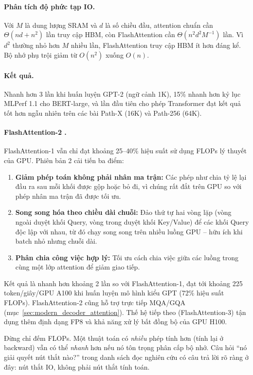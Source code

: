 \paragraph{Phân tích độ phức tạp IO.}
Với $M$ là dung lượng SRAM và $d$ là số chiều đầu, attention chuẩn cần $\Theta(nd + n^2)$ lần truy cập HBM, còn FlashAttention cần $\Theta(n^2 d^2 M^{-1})$ lần. Vì $d^2$ thường nhỏ hơn $M$ nhiều lần, FlashAttention truy cập HBM ít hơn đáng kể. Bộ nhớ phụ trội giảm từ $O(n^2)$ xuống $O(n)$.

\paragraph{Kết quả.} Nhanh hơn 3 lần khi huấn luyện GPT-2 (ngữ cảnh 1K), 15\% nhanh hơn kỷ lục MLPerf 1.1 cho BERT-large, và lần đầu tiên cho phép Transformer đạt kết quả tốt hơn ngẫu nhiên trên các bài Path-X (16K) và Path-256 (64K).

\paragraph{FlashAttention-2 \cite{dao2024flashattention2}.}
FlashAttention-1 vẫn chỉ đạt khoảng 25--40\% hiệu suất sử dụng FLOPs lý thuyết của GPU. Phiên bản 2 cải tiến ba điểm:
\begin{enumerate}
	\item \textbf{Giảm phép toán không phải nhân ma trận:} Các phép như chia tỷ lệ lại đầu ra sau mỗi khối được gộp hoặc bỏ đi, vì chúng rất đắt trên GPU so với phép nhân ma trận đã được tối ưu.
	\item \textbf{Song song hóa theo chiều dài chuỗi:} Đảo thứ tự hai vòng lặp (vòng ngoài duyệt khối Query, vòng trong duyệt khối Key/Value) để các khối Query độc lập với nhau, từ đó chạy song song trên nhiều luồng GPU -- hữu ích khi batch nhỏ nhưng chuỗi dài.
	\item \textbf{Phân chia công việc hợp lý:} Tối ưu cách chia việc giữa các luồng trong cùng một lớp attention để giảm giao tiếp.
\end{enumerate}
Kết quả là nhanh hơn khoảng 2 lần so với FlashAttention-1, đạt tới khoảng 225 token/giây/GPU A100 khi huấn luyện mô hình kiểu GPT (72\% hiệu suất FLOPs). FlashAttention-2 cũng hỗ trợ trực tiếp MQA/GQA (mục~\ref{sec:modern_decoder_attention}). Thế hệ tiếp theo (FlashAttention-3) tận dụng thêm định dạng FP8 và khả năng xử lý bất đồng bộ của GPU H100.

\begin{tcolorbox}[title={Bài học từ FlashAttention}, colback=blue!5!white, colframe=blue!60!black, fonttitle=\bfseries]
Đừng chỉ đếm FLOPs. Một thuật toán có \emph{nhiều} phép tính hơn (tính lại ở backward) vẫn có thể \emph{nhanh} hơn nếu nó tôn trọng phân cấp bộ nhớ. Câu hỏi “nó giải quyết nút thắt nào?” trong danh sách đọc nghiên cứu có câu trả lời rõ ràng ở đây: nút thắt IO, không phải nút thắt tính toán.
\end{tcolorbox}

